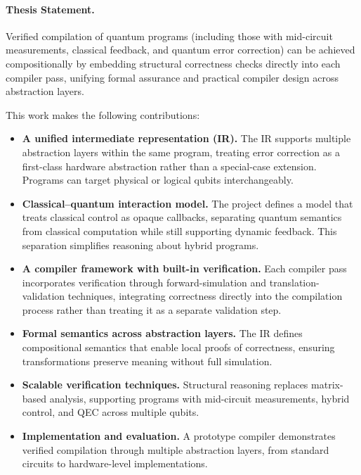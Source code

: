 \paragraph{Thesis Statement.}
Verified compilation of quantum programs (including those with mid-circuit measurements, classical feedback, and quantum error correction) can be achieved compositionally by embedding structural correctness checks directly into each compiler pass, unifying formal assurance and practical compiler design across abstraction layers.

\vspace{2em}

This work makes the following contributions:

\begin{itemize}
  \item \textbf{A unified intermediate representation (IR).}  
  The IR supports multiple abstraction layers within the same program, treating error correction as a first-class hardware abstraction rather than a special-case extension. Programs can target physical or logical qubits interchangeably.

  \item \textbf{Classical–quantum interaction model.} The project defines a model that treats classical control as opaque callbacks, separating quantum semantics from classical computation while still supporting dynamic feedback. This separation simplifies reasoning about hybrid programs.

  \item \textbf{A compiler framework with built-in verification.}  Each compiler pass incorporates verification through forward-simulation and translation-validation techniques, integrating correctness directly into the compilation process rather than treating it as a separate validation step.
  
  \item \textbf{Formal semantics across abstraction layers.}  
  The IR defines compositional semantics that enable local proofs of correctness, ensuring transformations preserve meaning without full simulation.
  
  \item \textbf{Scalable verification techniques.}  
  Structural reasoning replaces matrix-based analysis, supporting programs with mid-circuit measurements, hybrid control, and QEC across multiple qubits.
  
  \item \textbf{Implementation and evaluation.}  
  A prototype compiler demonstrates verified compilation through multiple abstraction layers, from standard circuits to hardware-level implementations.
\end{itemize}

